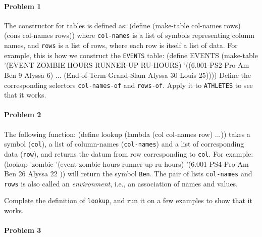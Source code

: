 \paragraph{Problem 1}

The constructor for tables is defined as:
\beginlisp
(define (make-table col-names rows)
  (cons col-names rows))
\endlisp
 where {\tt col-names} is a list of symbols representing column names, and
{\tt rows} is a list of rows, where each row is itself a list of data.  For
example, this is how we construct the {\tt EVENTS} table:
 \beginlisp
(define EVENTS
  (make-table
    '(EVENT                            ZOMBIE     HOURS  RUNNER-UP  RU-HOURS)
    '((6.001-PS2-Pro-Am                 Ben        9      Alyssa     6)
      ...
      (End-of-Term-Grand-Slam           Alyssa     30     Louis      25))))
\endlisp
 Define the corresponding selectors {\tt col-names-of} and {\tt rows-of}.
Apply it to {\tt ATHLETES} to see that it works.

\paragraph{Problem 2}

The following function:
\beginlisp
(define lookup
  (lambda (col col-names row)
    ...))
\endlisp
 takes a symbol ({\tt col}), a list of column-names ({\tt col-names}) and a list
of corresponding data ({\tt row}), and returns the datum from row
corresponding to {\tt col}.  For example:
\beginlisp
(lookup 'zombie
        '(event             zombie  hours  runner-up  ru-hours)
        '(6.001-PS4-Pro-Am  Ben     26     Alyssa     22      ))
\endlisp
will return the symbol {\tt Ben}.  The pair of lists {\tt col-names} and {\tt
rows} is also called an {\em environment\/}, i.e.,  an association of names
and values.

Complete the definition of {\tt lookup}, and run it on a few examples to
show that it works.

\paragraph{Problem 3}

